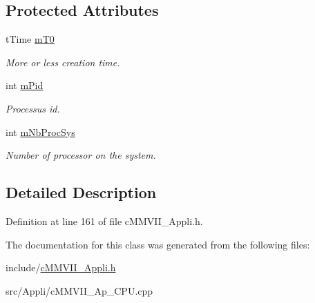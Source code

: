 \subsection*{Protected Attributes}
\begin{DoxyCompactItemize}
\item 
t\+Time \hyperlink{classMMVII_1_1cMMVII__Ap__CPU_ab4fa8825b4da68a5e4f8c69ad2a4ad9a}{m\+T0}\hypertarget{classMMVII_1_1cMMVII__Ap__CPU_ab4fa8825b4da68a5e4f8c69ad2a4ad9a}{}\label{classMMVII_1_1cMMVII__Ap__CPU_ab4fa8825b4da68a5e4f8c69ad2a4ad9a}

\begin{DoxyCompactList}\small\item\em More or less creation time. \end{DoxyCompactList}\item 
int \hyperlink{classMMVII_1_1cMMVII__Ap__CPU_af79817c11db75c60d82d7320d0b0c733}{m\+Pid}\hypertarget{classMMVII_1_1cMMVII__Ap__CPU_af79817c11db75c60d82d7320d0b0c733}{}\label{classMMVII_1_1cMMVII__Ap__CPU_af79817c11db75c60d82d7320d0b0c733}

\begin{DoxyCompactList}\small\item\em Processus id. \end{DoxyCompactList}\item 
int \hyperlink{classMMVII_1_1cMMVII__Ap__CPU_a39b1114f723d34788cbb4bee298202c6}{m\+Nb\+Proc\+Sys}\hypertarget{classMMVII_1_1cMMVII__Ap__CPU_a39b1114f723d34788cbb4bee298202c6}{}\label{classMMVII_1_1cMMVII__Ap__CPU_a39b1114f723d34788cbb4bee298202c6}

\begin{DoxyCompactList}\small\item\em Number of processor on the system. \end{DoxyCompactList}\end{DoxyCompactItemize}


\subsection{Detailed Description}


Definition at line 161 of file c\+M\+M\+V\+I\+I\+\_\+\+Appli.\+h.



The documentation for this class was generated from the following files\+:\begin{DoxyCompactItemize}
\item 
include/\hyperlink{cMMVII__Appli_8h}{c\+M\+M\+V\+I\+I\+\_\+\+Appli.\+h}\item 
src/\+Appli/c\+M\+M\+V\+I\+I\+\_\+\+Ap\+\_\+\+C\+P\+U.\+cpp\end{DoxyCompactItemize}
